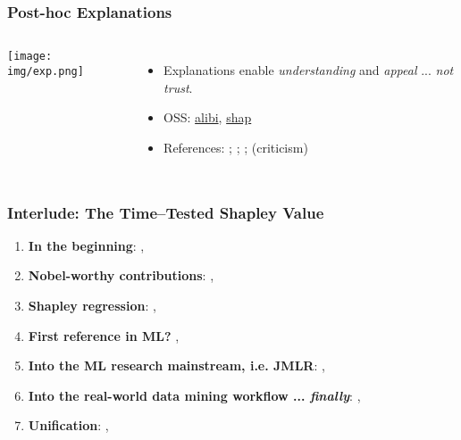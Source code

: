 \documentclass[11pt,
               aspectratio=169,
               hyperref={colorlinks}
               ]{beamer}
\begin{document}
			\begin{frame}
		
				\frametitle{Post-hoc Explanations}		
			
				\begin{columns}
	
					\centering
					\texttt{[image: img/exp.png]}
				
					\vspace{-5pt}
					
					\small{
					\begin{itemize}
						\item Explanations enable \textit{understanding} and \textit{appeal} ... \textit{not trust}.
						\item OSS: \href{https://github.com/SeldonIO/alibi}{alibi}, \href{https://github.com/slundberg/shap}{shap} 
						\item References: ; ; ;  (criticism)
					\end{itemize}}
				
				\end{columns}
		
			\end{frame}
	
			\begin{frame}
		
				\frametitle{Interlude: The Time--Tested Shapley Value}		
			
				\begin{enumerate}
				
					\item \textbf{In the beginning}: , \citefield{shapley1953value}{year}
					\item \textbf{Nobel-worthy contributions}: , \citefield{shapley1988shapley}{year}
					\item \textbf{Shapley regression}: , \citefield{lipovetsky2001analysis}{year}
					\item \textbf{First reference in ML?} , \citefield{keinan2004fair}{year} 	
					\item \textbf{Into the ML research mainstream, i.e. JMLR}: , \citefield{kononenko2010efficient}{year}
					\item \textbf{Into the real-world data mining workflow ... \textit{finally}}: , \citefield{tree_shap}{year}	
					\item \textbf{Unification}: , \citefield{shapley}{year}	
				
				\end{enumerate}
			
			\end{frame}
			
\end{document}
